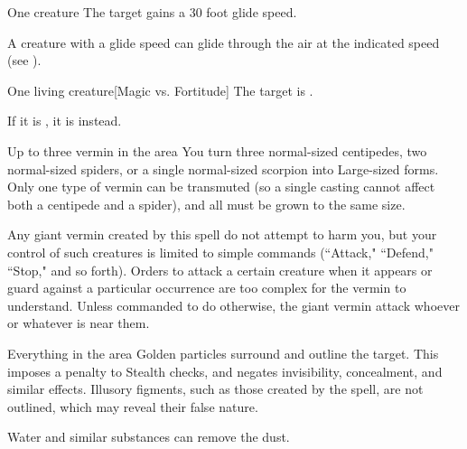 \spellrng{\rngmed}
\spelldur{\durlong}
\begin{spelltarget}{One creature}
    \spelleffect The target gains a 30 foot glide speed.
\end{spelltarget}
\spellnotes A creature with a glide speed can glide through the air at the indicated speed (see ).

\spellrng{\rngmed}
\begin{spelltarget}{One living creature}[Magic vs. Fortitude]
    \spellsuccess The target is \sickened.

    If it is \bloodied, it is \nauseated instead.
\end{spelltarget}

\spelldur{\durmed}
\begin{spelltarget}{Up to three vermin in the area}
    \spelleffect You turn three normal-sized centipedes, two normal-sized spiders, or a single normal-sized scorpion into Large-sized forms. Only one type of vermin can be transmuted (so a single casting cannot affect both a centipede and a spider), and all must be grown to the same size.
    \par Any giant vermin created by this spell do not attempt to harm you, but your control of such creatures is limited to simple commands (``Attack," ``Defend," ``Stop," and so forth). Orders to attack a certain creature when it appears or guard against a particular occurrence are too complex for the vermin to understand. Unless commanded to do otherwise, the giant vermin attack whoever or whatever is near them.
\end{spelltarget}

\spelldur{\durshort}
\begin{spelltarget}{Everything in the area}
    \spelleffect Golden particles surround and outline the target. This imposes a  penalty to Stealth checks, and negates invisibility, concealment, and similar effects. Illusory figments, such as those created by the  spell, are not outlined, which may reveal their false nature.
\end{spelltarget}
\spellnotes Water and similar substances can remove the dust.

